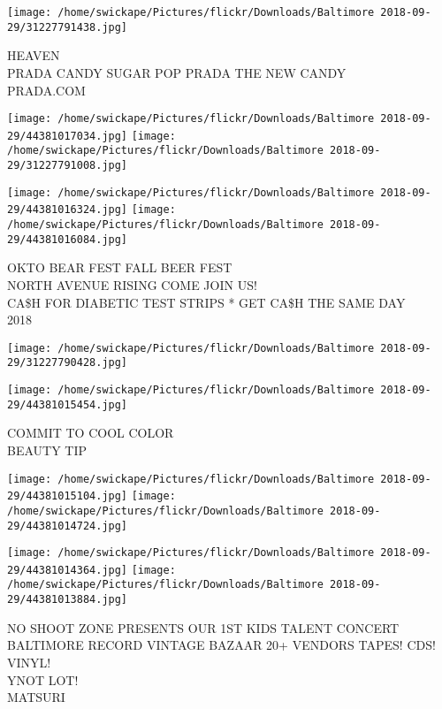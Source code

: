 \documentclass[10pt,letterpaper]{article}
\begin{document}
\vspace{0.25in}
\texttt{[image: /home/swickape/Pictures/flickr/Downloads/Baltimore 2018-09-29/31227791438.jpg]}

HEAVEN\\
PRADA CANDY SUGAR POP PRADA THE NEW CANDY\\
PRADA.COM\\
\pagebreak

\texttt{[image: /home/swickape/Pictures/flickr/Downloads/Baltimore 2018-09-29/44381017034.jpg]}
\texttt{[image: /home/swickape/Pictures/flickr/Downloads/Baltimore 2018-09-29/31227791008.jpg]}

\texttt{[image: /home/swickape/Pictures/flickr/Downloads/Baltimore 2018-09-29/44381016324.jpg]}
\texttt{[image: /home/swickape/Pictures/flickr/Downloads/Baltimore 2018-09-29/44381016084.jpg]}

OKTO BEAR FEST FALL BEER FEST\\
NORTH AVENUE RISING COME JOIN US!\\
CA\$H FOR DIABETIC TEST STRIPS * GET CA\$H THE SAME DAY\\
2018\\
\pagebreak

\texttt{[image: /home/swickape/Pictures/flickr/Downloads/Baltimore 2018-09-29/31227790428.jpg]}

\vspace{0.25in}
\texttt{[image: /home/swickape/Pictures/flickr/Downloads/Baltimore 2018-09-29/44381015454.jpg]}

COMMIT TO COOL COLOR\\
BEAUTY TIP\\
\pagebreak

\texttt{[image: /home/swickape/Pictures/flickr/Downloads/Baltimore 2018-09-29/44381015104.jpg]}
\texttt{[image: /home/swickape/Pictures/flickr/Downloads/Baltimore 2018-09-29/44381014724.jpg]}

\texttt{[image: /home/swickape/Pictures/flickr/Downloads/Baltimore 2018-09-29/44381014364.jpg]}
\texttt{[image: /home/swickape/Pictures/flickr/Downloads/Baltimore 2018-09-29/44381013884.jpg]}

NO SHOOT ZONE PRESENTS OUR 1ST KIDS TALENT CONCERT\\
BALTIMORE RECORD VINTAGE BAZAAR 20+ VENDORS TAPES!  CDS!  VINYL!\\
YNOT LOT!\\
MATSURI\\
\pagebreak
\end{document}
